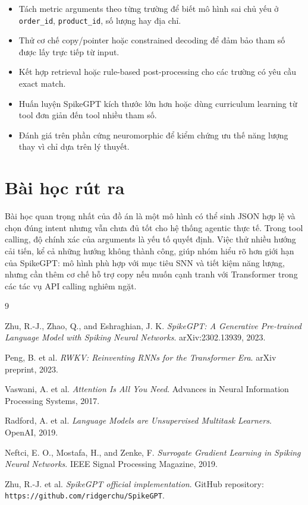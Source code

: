 \documentclass[12pt,a4paper,oneside]{report}
\newlength{\manualparindent}
\newcommand{\manualindent}{\hspace*{\manualparindent}}
\begin{document}
\begin{itemize}
  \item Tách metric arguments theo từng trường để biết mô hình sai chủ yếu ở \texttt{order\_id}, \texttt{product\_id}, số lượng hay địa chỉ.
  \item Thử cơ chế copy/pointer hoặc constrained decoding để đảm bảo tham số được lấy trực tiếp từ input.
  \item Kết hợp retrieval hoặc rule-based post-processing cho các trường có yêu cầu exact match.
  \item Huấn luyện SpikeGPT kích thước lớn hơn hoặc dùng curriculum learning từ tool đơn giản đến tool nhiều tham số.
  \item Đánh giá trên phần cứng neuromorphic để kiểm chứng ưu thế năng lượng thay vì chỉ dựa trên lý thuyết.
\end{itemize}

\section{Bài học rút ra}

\manualindent%
Bài học quan trọng nhất của đồ án là một mô hình có thể sinh JSON hợp lệ và chọn đúng intent nhưng vẫn chưa đủ tốt cho hệ thống agentic thực tế. Trong tool calling, độ chính xác của arguments là yếu tố quyết định. Việc thử nhiều hướng cải tiến, kể cả những hướng không thành công, giúp nhóm hiểu rõ hơn giới hạn của SpikeGPT: mô hình phù hợp với mục tiêu SNN và tiết kiệm năng lượng, nhưng cần thêm cơ chế hỗ trợ copy nếu muốn cạnh tranh với Transformer trong các tác vụ API calling nghiêm ngặt.

\begin{thebibliography}{9}

Zhu, R.-J., Zhao, Q., and Eshraghian, J. K. \textit{SpikeGPT: A Generative Pre-trained Language Model with Spiking Neural Networks}. arXiv:2302.13939, 2023.

Peng, B. et al. \textit{RWKV: Reinventing RNNs for the Transformer Era}. arXiv preprint, 2023.

Vaswani, A. et al. \textit{Attention Is All You Need}. Advances in Neural Information Processing Systems, 2017.

Radford, A. et al. \textit{Language Models are Unsupervised Multitask Learners}. OpenAI, 2019.

Neftci, E. O., Mostafa, H., and Zenke, F. \textit{Surrogate Gradient Learning in Spiking Neural Networks}. IEEE Signal Processing Magazine, 2019.

Zhu, R.-J. et al. \textit{SpikeGPT official implementation}. GitHub repository: \texttt{https://github.com/ridgerchu/SpikeGPT}.

\end{thebibliography}
\end{document}
